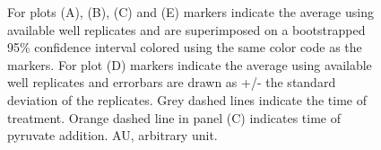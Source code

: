 \documentclass[9pt,lineno]{elife}
\begin{document}
\begin{figure}[ht!]
{For plots (A), (B), (C) and (E) markers indicate the average using available well replicates and are superimposed on a bootstrapped 95\% confidence interval colored using the same color code as the markers.
For plot (D) markers indicate the average using available well replicates and errorbars are drawn as +/- the standard deviation of the replicates.
Grey dashed lines indicate the time of treatment.
Orange dashed line in panel (C) indicates time of pyruvate addition.
AU, arbitrary unit.
}{}\label{figsupp:f2S1}
\label{figsupp:f2S2}
\end{figure}
\end{document}
